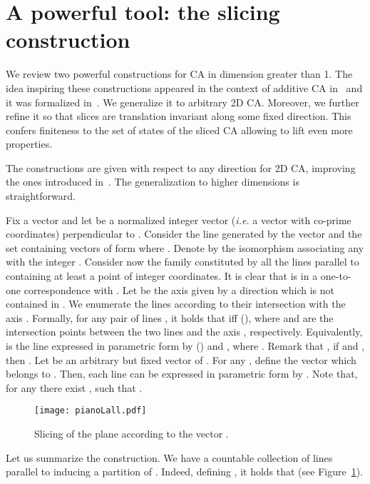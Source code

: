 \documentclass{llncs}
\makeatletter
\newcommand{\ie}{\emph{i.e.}\@\xspace}
\makeatother
\begin{document}
\section{A powerful tool: the slicing construction}
\label{sec:slicing}

We review two powerful constructions for CA in
dimension greater than 1. The idea inspiring these constructions
appeared in the context of additive CA in~\cite{margara99} and it
was formalized in~\cite{CDM04}.  We
generalize it to arbitrary 2D CA. Moreover, we further refine it
so that slices are translation invariant along some fixed
direction. This confers finiteness to the set of states of the
sliced CA allowing to lift even more properties.
\smallskip

The constructions are given with respect to any direction for 2D
CA, improving the ones introduced in~\cite{dennunzio08}. The
generalization to higher dimensions is straightforward.
\smallskip

Fix a vector  and let  be a normalized
integer vector (\ie a vector with co-prime coordinates)
perpendicular to . Consider the line  generated by the
vector  and the set  containing vectors of
form  where . Denote by
 the isomorphism associating any
 with the integer . Consider now the
family  constituted by all the lines parallel to
 containing at least a point of integer coordinates.
It is clear that  is in a one-to-one correspondence
with . Let  be the axis given by a direction 
which is not contained in . We enumerate the lines according
to their intersection with the axis . Formally, for any pair
of lines , it holds that  iff 
(), where  and 
 are the intersection points between the two lines
and the axis , respectively. Equivalently,  is the line
expressed in parametric form by 
() and , where . Remark that , if  and
, then . Let  be an
arbitrary but fixed vector of . For any , define the
vector  which belongs to . Then, each
line  can be expressed in parametric form by
. Note that, for any  there exist
, such that .
\begin{figure}[!htb]
  \begin{center}
     \texttt{[image: pianoLall.pdf]}
   \end{center}
   \caption{Slicing of the plane according to the vector .}
 \label{fig:slicing-plane}
\end{figure}
Let us summarize the construction. We have a countable collection
 of lines parallel to 
inducing a partition of . Indeed, defining
, it holds that 
(see Figure~\ref{fig:slicing-plane}).
\end{document}
